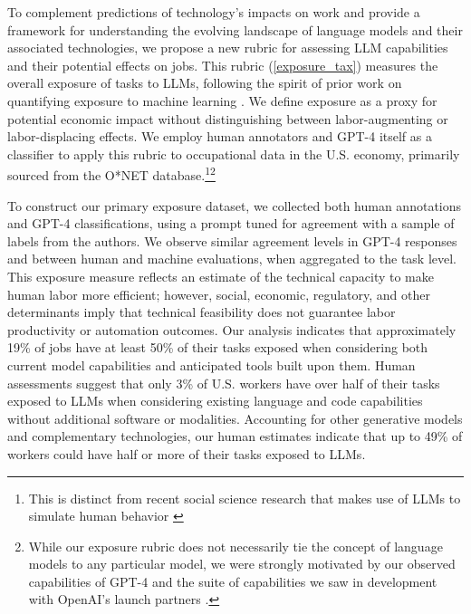 \documentclass[11pt]{article}
\begin{document}
To complement predictions of technology's impacts on work and provide a framework for understanding the evolving landscape of language models and their associated technologies, we propose a new rubric for assessing LLM capabilities and their potential effects on jobs. This rubric (\ref{exposure_tax}) measures the overall exposure of tasks to LLMs, following the spirit of prior work on quantifying exposure to machine learning \citep{Brynjolfsson2018, SeamansRajFelten2018, Webb2020}. We define exposure as a proxy for potential economic impact without distinguishing between labor-augmenting or labor-displacing effects. We employ human annotators and GPT-4 itself as a classifier to apply this rubric to occupational data in the U.S. economy, primarily sourced from the O*NET database.\footnote{This is distinct from recent social science research that makes use of LLMs to simulate human behavior \citep{horton2023large, Sorensen_2022}}\footnote{While our exposure rubric does not necessarily tie the concept of language models to any particular model, we were strongly motivated by our observed capabilities of GPT-4 and the suite of capabilities we saw in development with OpenAI's launch partners \citep{gpt4}.}

To construct our primary exposure dataset, we collected both human annotations and GPT-4 classifications, using a prompt tuned for agreement with a sample of labels from the authors. We observe similar agreement levels in GPT-4 responses and between human and machine evaluations, when aggregated to the task level. This exposure measure reflects an estimate of the technical capacity to make human labor more efficient; however, social, economic, regulatory, and other determinants imply that technical feasibility does not guarantee labor productivity or automation outcomes. Our analysis indicates that approximately 19\% of jobs have at least 50\% of their tasks exposed when considering both current model capabilities and anticipated tools built upon them. Human assessments suggest that only 3\% of U.S. workers have over half of their tasks exposed to LLMs when considering existing language and code capabilities without additional software or modalities. Accounting for other generative models and complementary technologies, our human estimates indicate that up to 49\% of workers could have half or more of their tasks exposed to LLMs. 
\end{document}
